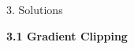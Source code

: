 \documentclass[final]{beamer}
\begin{document}
\begin{frame}[t]
\begin{columns}[t,totalwidth=\textwidth]
\begin{column}{0.3\textwidth}
        

    \begin{block}{3. Solutions }

        \textbf{3.1 Gradient Clipping}
            

\end{block}
\end{column}
\end{columns}
\end{frame}
\end{document}

